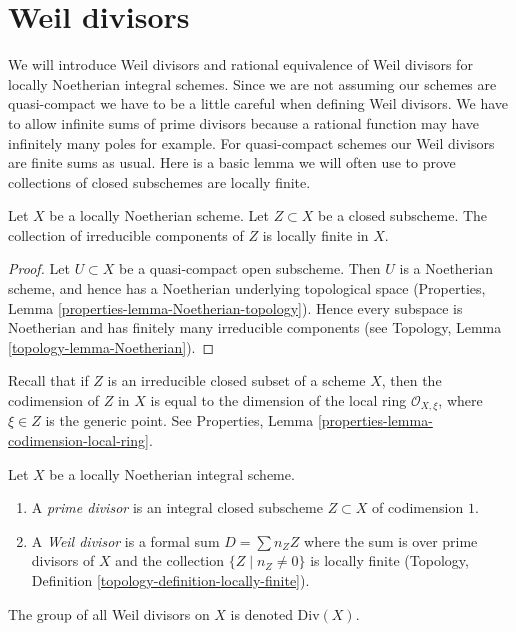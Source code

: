 \section{Weil divisors}
\label{section-Weil-divisors}

\noindent
We will introduce Weil divisors and rational equivalence of Weil
divisors for locally Noetherian integral schemes.
Since we are not assuming our schemes are quasi-compact we have
to be a little careful when defining Weil divisors. We have to allow
infinite sums of prime divisors because a rational function may have
infinitely many poles for example. For quasi-compact schemes our
Weil divisors are finite sums as usual. Here is a basic lemma we will
often use to prove collections of closed subschemes are locally finite.

\begin{lemma}
\label{lemma-components-locally-finite}
Let $X$ be a locally Noetherian scheme. Let $Z \subset X$ be a closed
subscheme. The collection of irreducible components of $Z$
is locally finite in $X$.
\end{lemma}

\begin{proof}
Let $U \subset X$ be a quasi-compact open subscheme. Then $U$ is a Noetherian
scheme, and hence has a Noetherian underlying topological space
(Properties, Lemma \ref{properties-lemma-Noetherian-topology}).
Hence every subspace is Noetherian and
has finitely many irreducible components
(see Topology, Lemma \ref{topology-lemma-Noetherian}).
\end{proof}

\noindent
Recall that if $Z$ is an irreducible closed subset of a scheme $X$,
then the codimension of $Z$ in $X$ is equal to the dimension
of the local ring $\mathcal{O}_{X, \xi}$, where $\xi \in Z$
is the generic point. See
Properties, Lemma \ref{properties-lemma-codimension-local-ring}.

\begin{definition}
\label{definition-Weil-divisor}
Let $X$ be a locally Noetherian integral scheme.
\begin{enumerate}
\item A {\it prime divisor} is an integral closed subscheme $Z \subset X$
of codimension $1$.
\item A {\it Weil divisor} is a formal sum $D = \sum n_Z Z$ where
the sum is over prime divisors of $X$ and the collection
$\{Z \mid n_Z \not = 0\}$ is locally finite
(Topology, Definition \ref{topology-definition-locally-finite}).
\end{enumerate}
The group of all Weil divisors on $X$ is denoted $\text{Div}(X)$.
\end{definition}

